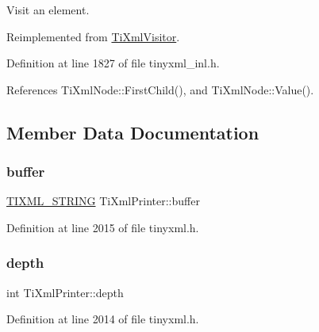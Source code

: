 Visit an element. 



Reimplemented from \hyperlink{class_ti_xml_visitor_aec2b1f8116226d52f3a1b95dafd3a32c}{Ti\+Xml\+Visitor}.



Definition at line 1827 of file tinyxml\+\_\+inl.\+h.



References Ti\+Xml\+Node\+::\+First\+Child(), and Ti\+Xml\+Node\+::\+Value().



\subsection{Member Data Documentation}
\hypertarget{class_ti_xml_printer_ae6cc56c79e52ef352ecc612809fdbedf}{}\label{class_ti_xml_printer_ae6cc56c79e52ef352ecc612809fdbedf} 
\subsubsection{\texorpdfstring{buffer}{buffer}}
{\footnotesize\ttfamily \hyperlink{tinyxml_8h_a92bada05fd84d9a0c9a5bbe53de26887}{T\+I\+X\+M\+L\+\_\+\+S\+T\+R\+I\+NG} Ti\+Xml\+Printer\+::buffer\hspace{0.3cm}{\ttfamily [private]}}



Definition at line 2015 of file tinyxml.\+h.

\hypertarget{class_ti_xml_printer_a7e11330449daea912320c22f84387df7}{}\label{class_ti_xml_printer_a7e11330449daea912320c22f84387df7} 
\subsubsection{\texorpdfstring{depth}{depth}}
{\footnotesize\ttfamily int Ti\+Xml\+Printer\+::depth\hspace{0.3cm}{\ttfamily [private]}}



Definition at line 2014 of file tinyxml.\+h.

\hypertarget{class_ti_xml_printer_a672fda389bb3f5a2ae8ead867f9a2536}{}\label{class_ti_xml_printer_a672fda389bb3f5a2ae8ead867f9a2536} 
